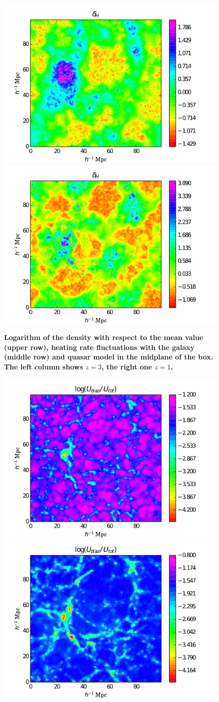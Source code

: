 \documentclass[twocolumns]{emulateapj}
\newcommand\ALc[1]{{\color{red} \bf #1}} %
\begin{document}
{\begin{figure}
\includegraphics[width = .45\textwidth ]{data_delta_z3_qso4.png}
\includegraphics[width = .45\textwidth ]{data_delta_z1_qso4.png}

   \caption{ \ALc{Logarithm of the density with respect to the mean value (upper row), heating rate fluctuations with the galaxy (middle row) and quasar model  in the midplane of the box. The left column shows $z=3$, the right one $z=1$. }}
  \label{fig:slice}
\end{figure}

\begin{figure}
  \centering
  \includegraphics[width = .45\textwidth ]{data_U_z3_gal2.png}
  \includegraphics[width = .45\textwidth ]{data_U_z1_gal2.png}


\end{figure}}
\end{document}
